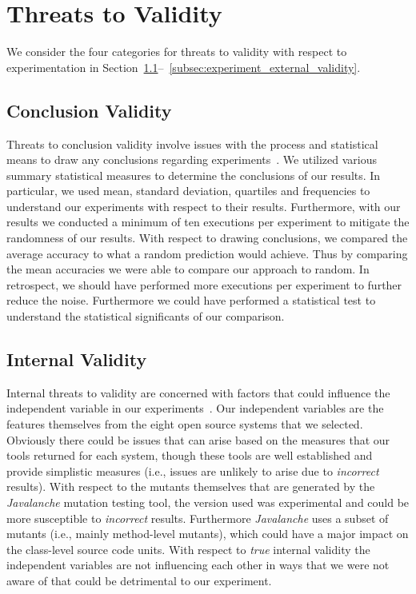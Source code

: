 \section{Threats to Validity}
\label{sec:experiment_threats}
We consider the four categories for threats to validity with respect to experimentation in Section~\ref{subsec:experiment_conclusion_validity}--~\ref{subsec:experiment_external_validity}.


\subsection{Conclusion Validity}
\label{subsec:experiment_conclusion_validity}
Threats to conclusion validity involve issues with the process and statistical means to draw any conclusions regarding experiments~\cite{WRH+00,WKP10}. We utilized various summary statistical measures to determine the conclusions of our results. In particular, we used mean, standard deviation, quartiles and frequencies to understand our experiments with respect to their results. Furthermore, with our results we conducted a minimum of ten executions per experiment to mitigate the randomness of our results. With respect to drawing conclusions, we compared the average accuracy to what a random prediction would achieve. Thus by comparing the mean accuracies we were able to compare our approach to random. In retrospect, we should have performed more executions per experiment to further reduce the noise. Furthermore we could have performed a statistical test to understand the statistical significants of our comparison.


\subsection{Internal Validity}
\label{subsec:experiment_internal_validity}
Internal threats to validity are concerned with factors that could influence the independent variable in our experiments~\cite{WRH+00,WKP10}. Our independent variables are the features themselves from the eight open source systems that we selected. Obviously there could be issues that can arise based on the measures that our tools returned for each system, though these tools are well established and provide simplistic measures (i.e., issues are unlikely to arise due to \emph{incorrect} results). With respect to the mutants themselves that are generated by the \emph{Javalanche} mutation testing tool, the version used was experimental and could be more susceptible to \emph{incorrect} results. Furthermore \emph{Javalanche} uses a subset of mutants (i.e., mainly method-level mutants), which could have a major impact on the class-level source code units. With respect to \emph{true} internal validity the independent variables are not influencing each other in ways that we were not aware of that could be detrimental to our experiment.


